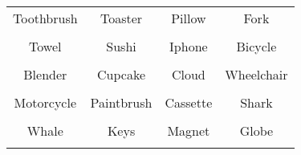 \documentclass[12pt,a4paper]{article}
\begin{document}
\thispagestyle{empty}
\begin{table}[]
\centering
\Huge
\begin{tabular}{cccc}
 Toothbrush& Toaster& Pillow& Fork\\  & & & \\
 Towel& Sushi& Iphone& Bicycle\\  & & & \\
 Blender& Cupcake& Cloud& Wheelchair\\  & & & \\
 Motorcycle& Paintbrush& Cassette& Shark\\  & & & \\
 Whale& Keys& Magnet& Globe\\  & & & \\
\end{tabular}
\end{table}
\end{document}
